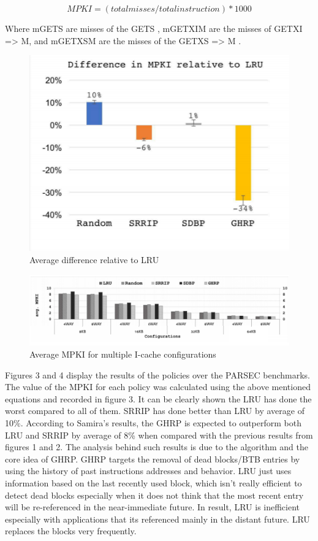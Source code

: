 \documentclass[11pt]{article}
\begin{document}
\begin{equation}
MPKI = (total misses/total instruction)*1000
\end{equation}

Where mGETS are misses of the GETS , mGETXIM are the
misses of GETXI => M, and mGETXSM are the misses
of the GETXS => M .

\begin{figure}[h]
	\caption{Average difference relative to LRU}
	\label{fig:fig1}
	\includegraphics[width=1\textwidth]{report1.PNG}
\end{figure}

\begin{figure}[h]
	\caption{Average MPKI for multiple I-cache configurations}
	\label{figs:fig2}
	\includegraphics[width=1\textwidth]{reportresult.PNG}
\end{figure}

Figures 3 and 4 display the results of the policies over the PARSEC benchmarks. The value of the MPKI for each policy was calculated using the above mentioned equations and
recorded in figure 3. It can be clearly shown the LRU has done the worst compared to all of them. SRRIP has done better than LRU by average of 10\%. According to Samira’s 
results, the GHRP is expected to outperform both LRU and SRRIP by average of 8\% when compared with the previous results from figures 1 and 2. 
The analysis behind such results is due to the algorithm and the core idea of GHRP. GHRP targets the removal of dead blocks/BTB entries by using the history of past 
instructions addresses and behavior. LRU just uses information based on the last recently used block, which isn’t really efficient to detect dead blocks especially when it does
not think that the most recent entry will be re-referenced in
the near-immediate future. 
In result, LRU is inefficient especially with applications that its referenced mainly in the distant future. LRU replaces the blocks very 
frequently. 
\end{document}
